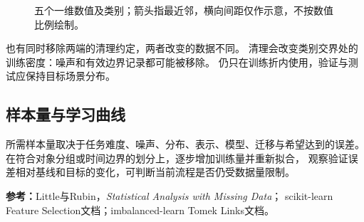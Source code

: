 \begin{figure}[htbp]
\centering
\caption{五个一维数值及类别；箭头指最近邻，横向间距仅作示意，不按数值比例绘制。}
\par\smallskip
{}
\end{figure}

也有同时移除两端的清理约定，两者改变的数据不同。
清理会改变类别交界处的训练密度：噪声和有效边界记录都可能被移除。
仍只在训练折内使用，验证与测试应保持目标场景分布。

\subsection{样本量与学习曲线}
\begin{keyidea}[判断数据需求]
所需样本量取决于任务难度、噪声、分布、表示、模型、迁移与希望达到的误差。
在符合对象分组或时间边界的划分上，逐步增加训练量并重新拟合，
观察验证误差相对基线和目标的变化，可判断当前流程是否仍受数据量限制。
\end{keyidea}

\begingroup\small
\noindent\textbf{参考：}Little与Rubin，\textit{Statistical Analysis with Missing Data}；
scikit-learn Feature Selection文档；imbalanced-learn Tomek Links文档。
\par\endgroup
